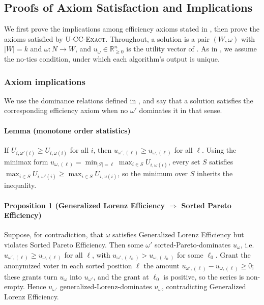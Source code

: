 \documentclass[letterpaper]{article} %
\newcommand{\Exact}{\textsc{U-CC-Exact}}
\begin{document}
\subsection{Proofs of Axiom Satisfaction and Implications}
\label{app:axiom-proofs}
We first prove the implications among efficiency axioms stated in , then prove the axioms satisfied by \Exact{}.
Throughout, a solution is a pair $(W,\omega)$ with $|W|=k$ and $\omega:N\to W$, and $u_\omega\in\mathbb{R}_{\ge0}^n$ is the utility vector of .
As in , we assume the no-ties condition, under which each algorithm's output is unique.

\subsubsection{Axiom implications} \label{app:axiom-implications}
We use the dominance relations defined in , and say that a solution satisfies the corresponding efficiency axiom when no $\omega'$ dominates it in that sense.

\paragraph{Lemma (monotone order statistics)} If $U_{i,\omega'(i)}\ge U_{i,\omega(i)}$ for all $i$, then $u_{\omega',(\ell)}\ge u_{\omega,(\ell)}$ for all $\ell$.
Using the minimax form $u_{\omega,(\ell)}=\min_{|S|=\ell}\max_{i\in S}U_{i,\omega(i)}$, every set $S$ satisfies $\max_{i\in S}U_{i,\omega'(i)}\ge\max_{i\in S}U_{i,\omega(i)}$, so the minimum over $S$ inherits the inequality.

\paragraph{Proposition 1 (Generalized Lorenz Efficiency $\Rightarrow$ Sorted Pareto Efficiency)} Suppose, for contradiction, that $\omega$ satisfies Generalized Lorenz Efficiency but violates Sorted Pareto Efficiency.
Then some $\omega'$ sorted-Pareto-dominates $u_\omega$, i.e.\ $u_{\omega',(\ell)}\ge u_{\omega,(\ell)}$ for all $\ell$, with $u_{\omega',(\ell_0)}>u_{\omega,(\ell_0)}$ for some $\ell_0$.
Grant the anonymized voter in each sorted position $\ell$ the amount $u_{\omega',(\ell)}-u_{\omega,(\ell)}\ge0$; these grants turn $u_\omega$ into $u_{\omega'}$, and the grant at $\ell_0$ is positive, so the series is non-empty.
Hence $u_{\omega'}$ generalized-Lorenz-dominates $u_\omega$, contradicting Generalized Lorenz Efficiency.
\end{document}
